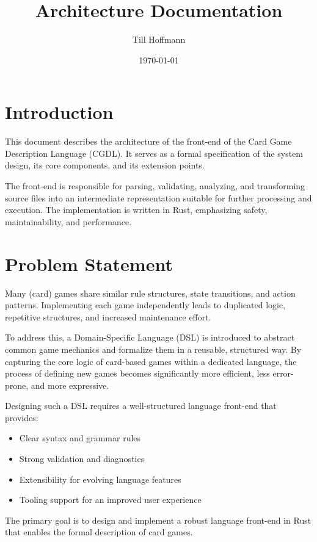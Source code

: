 \documentclass[a4paper,11pt]{article}
\title{Architecture Documentation}
\author{Till Hoffmann}
\date{\today}
\begin{document}
\maketitle
\tableofcontents
\newpage

\section{Introduction}

This document describes the architecture of the front-end of the Card Game Description Language (CGDL).
It serves as a formal specification of the system design, its core components, and its extension points.

The front-end is responsible for parsing, validating, analyzing, and transforming source files into an intermediate representation suitable for further processing and execution. The implementation is written in Rust, emphasizing safety, maintainability, and performance.

\section{Problem Statement}

Many (card) games share similar rule structures, state transitions, and action patterns.
Implementing each game independently leads to duplicated logic, repetitive structures, and increased maintenance effort.

To address this, a Domain-Specific Language (DSL) is introduced to abstract common game mechanics and formalize them in a reusable, structured way. By capturing the core logic of card-based games within a dedicated language, the process of defining new games becomes significantly more efficient, less error-prone, and more expressive.

Designing such a DSL requires a well-structured language front-end that provides:

\begin{itemize}
    \item Clear syntax and grammar rules
    \item Strong validation and diagnostics
    \item Extensibility for evolving language features
    \item Tooling support for an improved user experience
\end{itemize}

The primary goal is to design and implement a robust language front-end in Rust that enables the formal description of card games.
\end{document}
